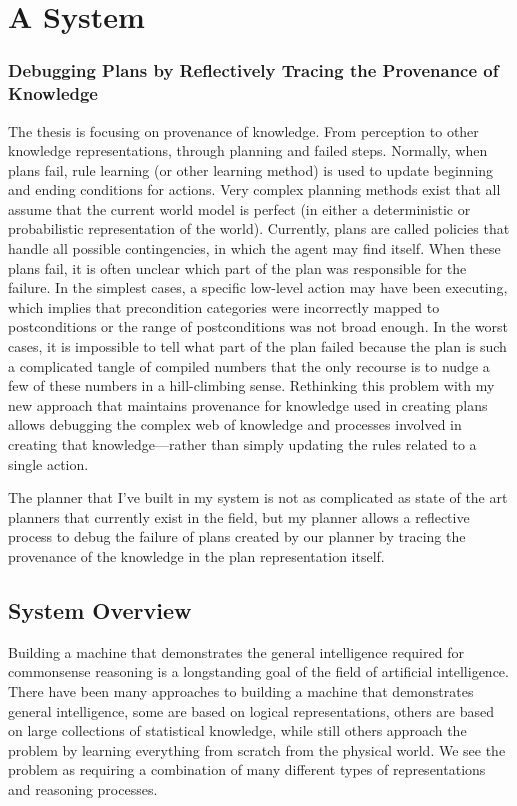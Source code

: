 \chapter{A System}\label{ch:a_system}

\subsection{Debugging Plans by Reflectively Tracing the Provenance of Knowledge}

The thesis is focusing on provenance of knowledge.  From perception to
other knowledge representations, through planning and failed steps.
Normally, when plans fail, rule learning (or other learning method) is
used to update beginning and ending conditions for actions.  Very
complex planning methods exist that all assume that the current world
model is perfect (in either a deterministic or probabilistic
representation of the world).  Currently, plans are called policies
that handle all possible contingencies, in which the agent may find
itself.  When these plans fail, it is often unclear which part of the
plan was responsible for the failure.  In the simplest cases, a
specific low-level action may have been executing, which implies that
precondition categories were incorrectly mapped to postconditions or
the range of postconditions was not broad enough.  In the worst cases,
it is impossible to tell what part of the plan failed because the plan
is such a complicated tangle of compiled numbers that the only
recourse is to nudge a few of these numbers in a hill-climbing sense.
Rethinking this problem with my new approach that maintains provenance
for knowledge used in creating plans allows debugging the complex web
of knowledge and processes involved in creating that
knowledge---rather than simply updating the rules related to a single
action.

The planner that I've built in my system is not as complicated as
state of the art planners that currently exist in the field, but my
planner allows a reflective process to debug the failure of plans
created by our planner by tracing the provenance of the knowledge in
the plan representation itself.

\section{System Overview}

Building a machine that demonstrates the general intelligence required
for commonsense reasoning is a longstanding goal of the field of
artificial intelligence.  There have been many approaches to building
a machine that demonstrates general intelligence, some are based on
logical representations, others are based on large collections of
statistical knowledge, while still others approach the problem by
learning everything from scratch from the physical world.  We see the
problem as requiring a combination of many different types of
representations and reasoning processes.

